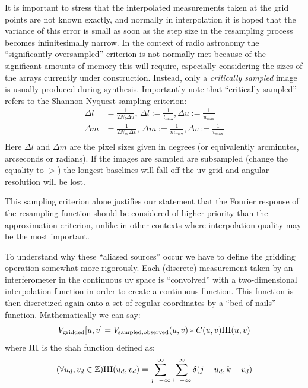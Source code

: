  It is important to stress that the interpolated measurements taken at the grid points are not known exactly, and normally in interpolation it is 
 hoped that the variance of this error is small as soon as the step size in the resampling process becomes infinitesimally narrow. In the context of
 radio astronomy the ``significantly oversampled'' criterion is not normally met because of the significant amounts of memory this will require, especially considering
 the sizes of the arrays currently under construction. Instead, only a \emph{critically sampled} image is usually produced during synthesis. Importantly
 note that ``critically sampled'' refers to the Shannon-Nyquest sampling criterion:
 \begin{equation}
  \label{eqn_img_sampling}
  \begin{split}
    \Delta{l} &= \frac{1}{2N_l\Delta{u}}\text{, }\Delta{l}:=\frac{1}{l_{\text{max}}},\Delta{u}:=\frac{1}{u_{\text{max}}}\\
    \Delta{m} &= \frac{1}{2N_m\Delta{v}}\text{, }\Delta{m}:=\frac{1}{m_{\text{max}}},\Delta{v}:=\frac{1}{v_{\text{max}}}\\
  \end{split}
 \end{equation}
 Here $\Delta{l}$ and $\Delta{m}$ are the pixel sizes given in degrees (or equivalently arcminutes, arcseconds or radians). If the images are sampled are 
 subsampled (change the equality to $>$) the longest baselines will fall off the uv grid and angular resolution will be lost. 
 
 This sampling criterion alone justifies our statement that the Fourier response of the resampling function should be considered of higher priority
 than the approximation criterion, unlike in other contexts where interpolation quality may be the most important.
 
 To understand why these ``aliased sources'' occur we have to define the gridding operation somewhat more rigorously. Each (discrete) measurement taken
 by an interferometer in the continuous uv space  is ``convolved'' with a two-dimensional interpolation function in order to create a continuous
 function. This function is then discretized again onto a set of regular coordinates by a ``bed-of-nails'' function. Mathematically we can say:
 \begin{equation}
  V_{\text{gridded}}[u,v] = V_{\text{sampled,observed}}(u,v)*C(u,v)\textrm{III}(u,v)
 \end{equation}
 where $\textrm{III}$ is the shah function defined as:
 \begin{equation}
  (\forall u_d,v_d\in\mathbb{Z})\textrm{III}(u_d,v_d)=\sum_{j=-\infty}^{\infty}{\sum_{i=-\infty}^{\infty}{\delta{(j-u_d,k-v_d)}}}
 \end{equation}
 
